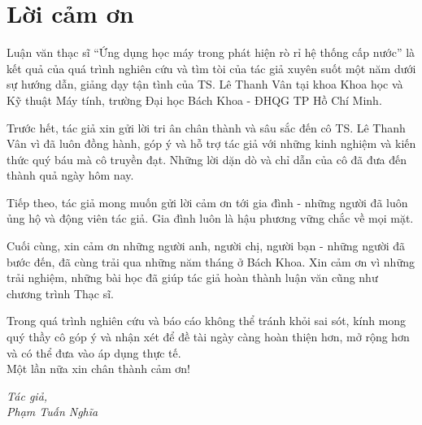 \chapter*{Lời cảm ơn}
Luận văn thạc sĩ ``Ứng dụng học máy trong phát hiện rò rỉ hệ thống cấp nước'' là kết quả của quá trình nghiên cứu và tìm tòi của tác giả xuyên suốt một năm dưới sự hướng dẫn, giảng dạy tận tình của TS. Lê Thanh Vân tại khoa Khoa học và Kỹ thuật Máy tính, trường Đại học Bách Khoa - ĐHQG TP Hồ Chí Minh. 

Trước hết, tác giả xin gửi lời tri ân chân thành và sâu sắc đến cô TS. Lê Thanh Vân vì đã luôn đồng hành, góp ý và hỗ trợ tác giả với những kinh nghiệm và kiến thức quý báu mà cô truyền đạt. Những lời dặn dò và chỉ dẫn của cô đã đưa đến thành quả ngày hôm nay. 

Tiếp theo, tác giả mong muốn gửi lời cảm ơn tới gia đình - những người đã luôn ủng hộ và động viên tác giả. Gia đình luôn là hậu phương vững chắc về mọi mặt. 

Cuối cùng, xin cảm ơn những người anh, người chị, người bạn - những người đã bước đến, đã cùng trải qua những năm tháng ở Bách Khoa. Xin cảm ơn vì những trải nghiệm, những bài học đã giúp tác giả hoàn thành luận văn cũng như chương trình Thạc sĩ.

Trong quá trình nghiên cứu và báo cáo không thể tránh khỏi sai sót, kính mong quý thầy cô góp ý và nhận xét để đề tài ngày càng hoàn thiện hơn, mở rộng hơn và có thể đưa vào áp dụng thực tế.\\

Một lần nữa xin chân thành cảm ơn!\\

\begin{flushright}
\textit{
Tác giả,\\
Phạm Tuấn Nghĩa
}
\end{flushright}